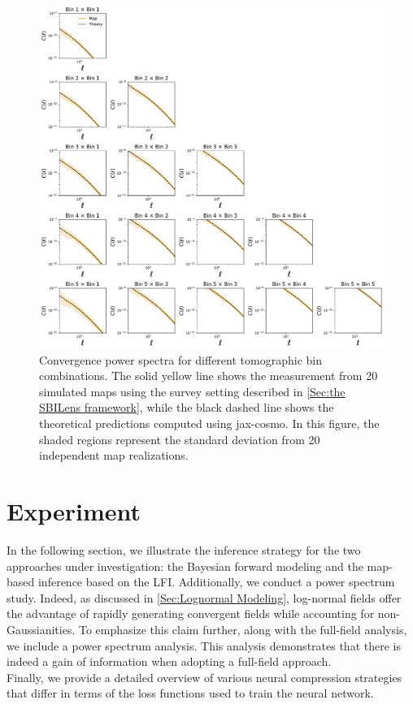 \documentclass{aa}
\begin{document}
\begin{figure}
    \centering
    \includegraphics[width=\textwidth]{figures/psconvergencemaps.pdf}
    \caption{
    Convergence power spectra for different tomographic bin combinations. The solid yellow line shows the measurement from 20 simulated maps using the survey setting described in \autoref{Sec:the SBILens framework}, while the black dashed line shows the theoretical predictions computed using jax-cosmo. In this figure, the shaded regions represent the standard deviation from 20 independent map realizations.
    }
     \label{fig:psconvergence_maps}
\end{figure}
\section{Experiment}\label{Sec:experiment}
In the following section, we illustrate the inference strategy for the two approaches under investigation: the Bayesian forward modeling and the map-based inference based on the LFI.
Additionally, we conduct a power spectrum study. Indeed, as discussed in \autoref{Sec:Lognormal Modeling}, log-normal fields offer the advantage of rapidly generating convergent fields while accounting for non-Gaussianities. To emphasize this claim further, along with the full-field analysis, we include a power spectrum analysis. This analysis demonstrates that there is indeed a gain of information when adopting a full-field approach. \\
Finally, we provide a detailed overview of various neural compression strategies that differ in terms of the loss functions used to train the neural network.
\end{document}
